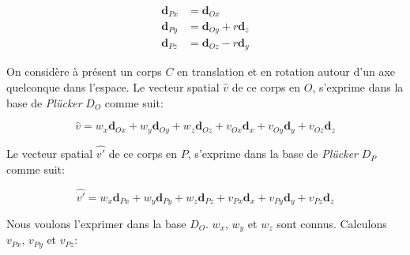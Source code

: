 \begin{align*}
  \textbf{d}_{Px} &= \textbf{d}_{Ox} \\
  \textbf{d}_{Py} &= \textbf{d}_{Oy}+r \textbf{d}_{z} \\
  \textbf{d}_{Pz} &= \textbf{d}_{Oz}-r \textbf{d}_{y}
\end{align*}

On considère à présent un corps $C$ en translation et en rotation autour d'un axe quelconque dans l'espace. Le vecteur spatial $\widehat{v}$ de ce corps en $O$, s'exprime dans la base de \emph{Plücker} $D_{O}$ comme suit:

\begin{equation*}
  \widehat{v} = w_{x}\textbf{d}_{Ox} + w_{y}\textbf{d}_{Oy} + w_{z}\textbf{d}_{Oz} + v_{Ox}\textbf{d}_{x} + v_{Oy}\textbf{d}_{y} + v_{Oz}\textbf{d}_{z}
\end{equation*}

Le vecteur spatial $\widehat{v'}$ de ce corps en $P$, s'exprime dans la base de \emph{Plücker} $D_{P}$ comme suit:

\begin{equation*}
  \widehat{v'} = w_{x}\textbf{d}_{Px} + w_{y}\textbf{d}_{Py} + w_{z}\textbf{d}_{Pz} + v_{Px}\textbf{d}_{x} + v_{Py}\textbf{d}_{y} + v_{Pz}\textbf{d}_{z}
\end{equation*}

Nous voulons l'exprimer dans la base $D_{O}$. $w_{x}$, $w_{y}$ et $w_{z}$ sont connus. Calculons $v_{Px}$, $v_{Py}$ et $v_{Pz}$:

